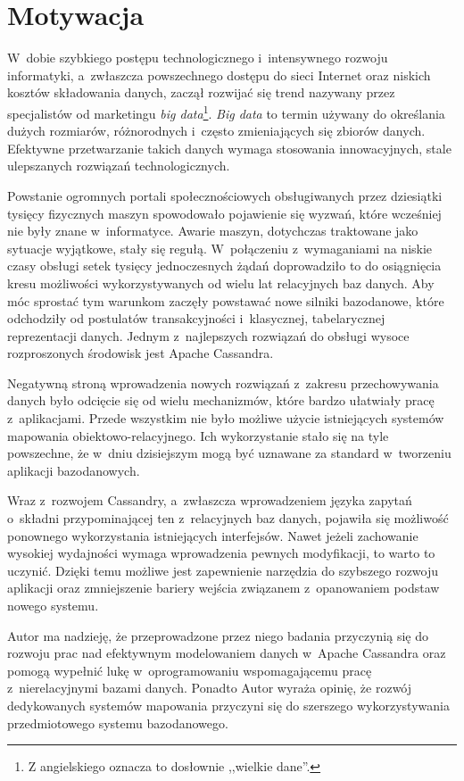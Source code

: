 \section{Motywacja}

W~dobie szybkiego postępu technologicznego i~intensywnego rozwoju informatyki, a~zwłaszcza powszechnego dostępu do sieci Internet oraz niskich kosztów składowania danych, zaczął rozwijać się trend nazywany przez specjalistów od marketingu \emph{big data}\footnote{Z angielskiego oznacza to dosłownie ,,wielkie dane''.}. \emph{Big data} to termin używany do określania dużych rozmiarów, różnorodnych i~często zmieniających się zbiorów danych.~\cite{big_data_definition} Efektywne przetwarzanie takich danych wymaga stosowania innowacyjnych, stale ulepszanych rozwiązań technologicznych. 

Powstanie ogromnych portali społecznościowych obsługiwanych przez dziesiątki tysięcy fizycznych maszyn spowodowało pojawienie się wyzwań, które wcześniej nie były znane w~informatyce. Awarie maszyn, dotychczas traktowane jako sytuacje wyjątkowe, stały się regułą. W~połączeniu z~wymaganiami na niskie czasy obsługi setek tysięcy jednoczesnych żądań doprowadziło to do osiągnięcia kresu możliwości wykorzystywanych od wielu lat relacyjnych baz danych. Aby móc sprostać tym warunkom zaczęły powstawać nowe silniki bazodanowe, które odchodziły od postulatów transakcyjności i~klasycznej, tabelarycznej reprezentacji danych. Jednym z~najlepszych rozwiązań do obsługi wysoce rozproszonych środowisk jest Apache Cassandra.

Negatywną stroną wprowadzenia nowych rozwiązań z~zakresu przechowywania danych było odcięcie się od wielu mechanizmów, które bardzo ułatwiały pracę z~aplikacjami. Przede wszystkim nie było możliwe użycie istniejących systemów mapowania obiektowo-relacyjnego. Ich wykorzystanie stało się na tyle powszechne, że w~dniu dzisiejszym mogą być uznawane za standard w~tworzeniu aplikacji bazodanowych.

Wraz z~rozwojem Cassandry, a~zwłaszcza wprowadzeniem języka zapytań o~składni przypominającej ten z~relacyjnych baz danych, pojawiła się możliwość ponownego wykorzystania istniejących interfejsów. Nawet jeżeli zachowanie wysokiej wydajności wymaga wprowadzenia pewnych modyfikacji, to warto to uczynić. Dzięki temu możliwe jest zapewnienie narzędzia do szybszego rozwoju aplikacji oraz zmniejszenie bariery wejścia związanem z~opanowaniem podstaw nowego systemu.

Autor ma nadzieję, że przeprowadzone przez niego badania przyczynią się do rozwoju prac nad efektywnym modelowaniem danych w~Apache Cassandra oraz pomogą wypełnić lukę w~oprogramowaniu wspomagającemu pracę z~nierelacyjnymi bazami danych. Ponadto Autor wyraża opinię, że rozwój dedykowanych systemów mapowania przyczyni się do szerszego wykorzystywania przedmiotowego systemu bazodanowego.


